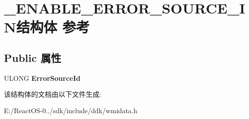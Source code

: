 \hypertarget{struct___e_n_a_b_l_e___e_r_r_o_r___s_o_u_r_c_e___i_n}{}\section{\+\_\+\+E\+N\+A\+B\+L\+E\+\_\+\+E\+R\+R\+O\+R\+\_\+\+S\+O\+U\+R\+C\+E\+\_\+\+I\+N结构体 参考}
\label{struct___e_n_a_b_l_e___e_r_r_o_r___s_o_u_r_c_e___i_n}
\subsection*{Public 属性}
\begin{DoxyCompactItemize}
\item 
\mbox{\label{struct___e_n_a_b_l_e___e_r_r_o_r___s_o_u_r_c_e___i_n_a6abb85148f8fe210ea954e8097345b8d}} 
U\+L\+O\+NG {\bfseries Error\+Source\+Id}
\end{DoxyCompactItemize}


该结构体的文档由以下文件生成\+:\begin{DoxyCompactItemize}
\item 
E\+:/\+React\+O\+S-\/0../sdk/include/ddk/wmidata.\+h\end{DoxyCompactItemize}
